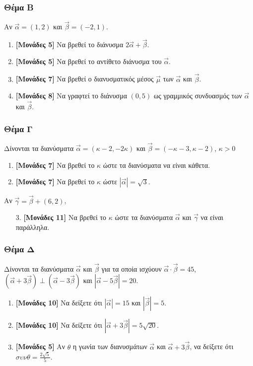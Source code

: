 \documentclass[12pt]{article}
\begin{document}
\section*{Θέμα Β}
  \noindent
  Αν $\vec{α}=(1,2)$ και $\vec{β}=(-2,1)$.
  \begin{enumerate}
    \item \textbf{[Μονάδες 5]} Να βρεθεί το διάνυσμα $2\vec{α}+\vec{β}$.
    \item \textbf{[Μονάδες 5]} Να βρεθεί το αντίθετο διάνυσμα του $\vec{α}$.
    \item \textbf{[Μονάδες 7]} Να βρεθεί ο διανυσματικός μέσος $\vec{μ}$ των $\vec{α}$ και $\vec{β}$.
    \item \textbf{[Μονάδες 8]} Να γραφτεί το διάνυσμα $(0,5)$ ως γραμμικός συνδυασμός των $\vec{α}$ και $\vec{β}$.
  \end{enumerate}

\section*{Θέμα Γ}
  \noindent
  Δίνονται τα διανύσματα $\vec{α}=(κ-2,-2κ)$ και $\vec{β}=(-κ-3,κ-2)$, $κ>0$
  \begin{enumerate}
    \item \textbf{[Μονάδες 7]} Να βρεθεί το $κ$ ώστε τα διανύσματα να είναι κάθετα.
    \item \textbf{[Μονάδες 7]} Να βρεθεί το $κ$ ώστε $|\vec{α}|=\sqrt{3}$.
  \end{enumerate}
  Αν $\vec{γ}=\vec{β}+(6,2)$,
  \begin{enumerate}
    \item[3.] \textbf{[Μονάδες 11]} Να βρεθεί το $κ$ ώστε τα διανύσματα $\vec{α}$ και $\vec{γ}$ να είναι παράλληλα.
  \end{enumerate}

\section*{Θέμα Δ}
  \noindent
  Δίνονται τα διανύσματα $\vec{α}$ και $\vec{β}$ για τα οποία ισχύουν $\vec{α}\cdot\vec{β}=45$, $\left(\vec{α}+3\vec{β}\right)\perp\left(\vec{α}-3\vec{β}\right)$ και $|\vec{α}-5\vec{β}|=20$.
  \begin{enumerate}
    \item \textbf{[Μονάδες 10]} Να δείξετε ότι $|\vec{α}|=15$ και $|\vec{β}|=5$.
    \item \textbf{[Μονάδες 10]} Να δείξετε ότι $|\vec{α}+3\vec{β}|=5\sqrt{20}$.
    \item \textbf{[Μονάδες 5]} Αν $θ$ η γωνία των διανυσμάτων $\vec{α}$ και $\vec{α}+3\vec{β}$, να δείξετε ότι $συνθ=\frac{2\sqrt{5}}{5}$.
  \end{enumerate}

\vspace{3\baselineskip}

\part*{}
\end{document}
